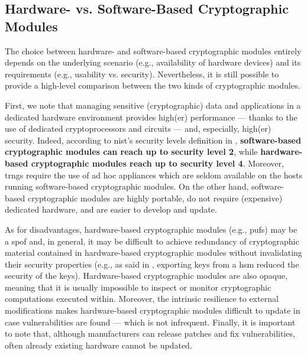 \subsection{Hardware- vs. Software-Based Cryptographic Modules}\label{sec:cryptographic_modules:software}

The choice between hardware- and software-based cryptographic modules entirely depends on the underlying scenario (e.g., availability of hardware devices) and its requirements (e.g., usability vs. security). Nevertheless, it is still possible to provide a high-level comparison between the two kinds of cryptographic modules.


First, we note that managing sensitive (cryptographic) data and applications in a dedicated hardware environment provides high(er) performance --- thanks to the use of dedicated cryptoprocessors and circuits --- and, especially, high(er) security. Indeed, according to \gls{nist}'s security levels definition in \cite{nist_security_2019}, \textbf{software-based cryptographic modules can reach up to security level 2}, while \textbf{hardware-based cryptographic modules reach up to security level 4}. Moreover, \glspl{trng} require the use of ad hoc appliances which are seldom available on the hosts running software-based cryptographic modules.
On the other hand, software-based cryptographic modules are highly portable, do not require (expensive) dedicated hardware, and are easier to develop and update.

As for disadvantages, hardware-based cryptographic modules (e.g., \glspl{puf}) may be a \gls{spof} and, in general, it may be difficult to achieve redundancy of cryptographic material contained in hardware-based cryptographic modules without invalidating their security properties (e.g., as said in , exporting keys from a \gls{hsm} reduced the security of the keys). Hardware-based cryptographic modules are also opaque, meaning that it is usually impossible to inspect or monitor cryptographic computations executed within. Moreover, the intrinsic resilience to external modifications makes hardware-based cryptographic modules difficult to update in case vulnerabilities are found --- which is not infrequent. Finally, it is important to note that, although manufacturers can release patches and fix vulnerabilities, often already existing hardware cannot be updated.

